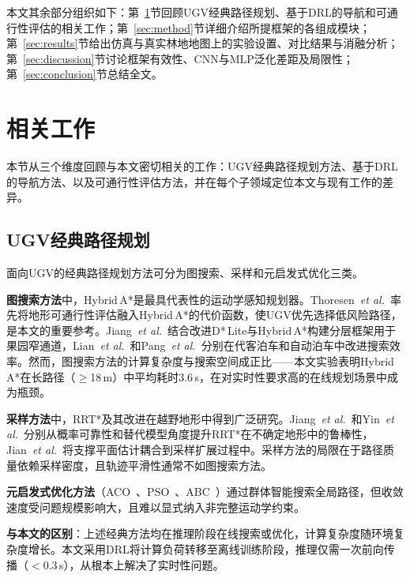 \documentclass[twocolumn]{elsarticle}
\newcommand{\etal}{\textit{et al.}}
\begin{document}
本文其余部分组织如下：第~\ref{sec:related}节回顾UGV经典路径规划、基于DRL的导航和可通行性评估的相关工作；第~\ref{sec:method}节详细介绍所提框架的各组成模块；第~\ref{sec:results}节给出仿真与真实林地地图上的实验设置、对比结果与消融分析；第~\ref{sec:discussion}节讨论框架有效性、CNN与MLP泛化差距及局限性；第~\ref{sec:conclusion}节总结全文。

\section{相关工作}\label{sec:related}

本节从三个维度回顾与本文密切相关的工作：UGV经典路径规划方法、基于DRL的导航方法、以及可通行性评估方法，并在每个子领域定位本文与现有工作的差异。

\subsection{UGV经典路径规划}

面向UGV的经典路径规划方法可分为图搜索、采样和元启发式优化三类。

\textbf{图搜索方法}中，Hybrid\,A*是最具代表性的运动学感知规划器。Thoresen~\etal~\cite{thoresen2021path}率先将地形可通行性评估融入Hybrid\,A*的代价函数，使UGV优先选择低风险路径，是本文的重要参考。Jiang~\etal~\cite{jiang2025hybrid}结合改进D*\,Lite与Hybrid\,A*构建分层框架用于果园窄通道，Lian~\etal~\cite{lian2023trajectory}和Pang~\etal~\cite{pang2022curvature}分别在代客泊车和自动泊车中改进搜索效率。然而，图搜索方法的计算复杂度与搜索空间成正比——本文实验表明Hybrid\,A*在长路径（$\geq$18\,m）中平均耗时3.6\,s，在对实时性要求高的在线规划场景中成为瓶颈。

\textbf{采样方法}中，RRT*及其改进在越野地形中得到广泛研究。Jiang~\etal~\cite{jiang2022r2rrt}和Yin~\etal~\cite{yin2023efficient}分别从概率可靠性和替代模型角度提升RRT*在不确定地形中的鲁棒性，Jian~\etal~\cite{jian2024path}将支撑平面估计耦合到采样扩展过程中。采样方法的局限在于路径质量依赖采样密度，且轨迹平滑性通常不如图搜索方法。

\textbf{元启发式优化方法}（ACO~\cite{cai2024cooperative,huo2024smooth,li2023mixing}、PSO~\cite{xu2022quartic}、ABC~\cite{yildirim2025efficient}）通过群体智能搜索全局路径，但收敛速度受问题规模影响大，且难以显式纳入非完整运动学约束。

\textbf{与本文的区别}：上述经典方法均在推理阶段在线搜索或优化，计算复杂度随环境复杂度增长。本文采用DRL将计算负荷转移至离线训练阶段，推理仅需一次前向传播（$<$0.3\,s），从根本上解决了实时性问题。
\end{document}

